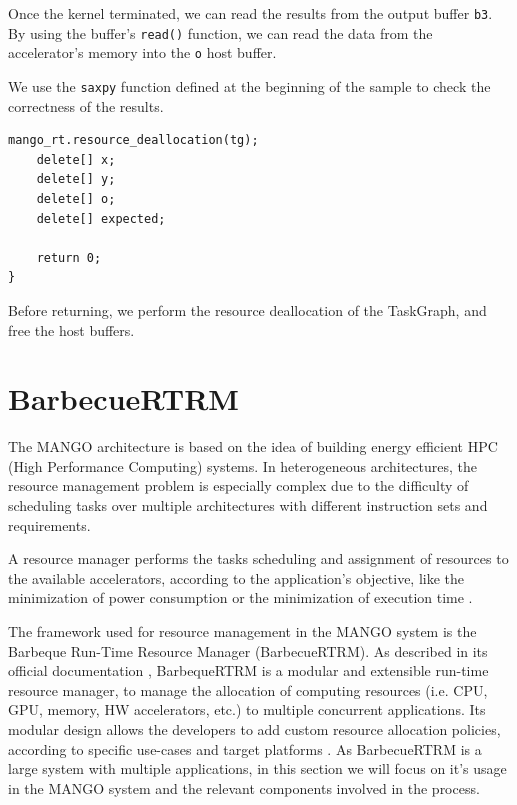 Once the kernel terminated, we can read the results from the output buffer \texttt{b3}. By using the buffer's \texttt{read()} function, we can read the data from the accelerator's memory into the \texttt{o} host buffer.

We use the \texttt{saxpy} function defined at the beginning of the sample to check the correctness of the results.

\begin{lstlisting}[style=CStyle, caption=Sample - Teardown]
    mango_rt.resource_deallocation(tg);
    delete[] x;
    delete[] y;
    delete[] o;
    delete[] expected;

    return 0;
}
\end{lstlisting}

Before returning, we perform the resource deallocation of the TaskGraph, and free the host buffers.

\section{BarbecueRTRM}

The MANGO architecture is based on the idea of building energy efficient HPC (High Performance Computing) systems. In heterogeneous architectures, the resource management problem is especially complex due to the difficulty of scheduling tasks over multiple architectures with different instruction sets and requirements.

A resource manager performs the tasks scheduling and assignment of resources to the available accelerators, according to the application's objective, like the minimization of power consumption or the minimization of execution time \cite{mango_exploring_manycore_architectures}.

The framework used for resource management in the MANGO system is the Barbeque Run-Time Resource Manager (BarbecueRTRM). 
As described in its official documentation \cite{bosp}, BarbequeRTRM is a modular and extensible run-time resource manager, to manage the allocation of computing resources (i.e. CPU, GPU, memory, HW accelerators, etc.) to multiple concurrent applications. Its modular design allows the developers to add custom resource allocation policies, according to specific use-cases and target platforms \cite{barbecue_1}\cite{barbecue_2}. As BarbecueRTRM is a large system with multiple applications, in this section we will focus on it's usage in the MANGO system and the relevant components involved in the process.

